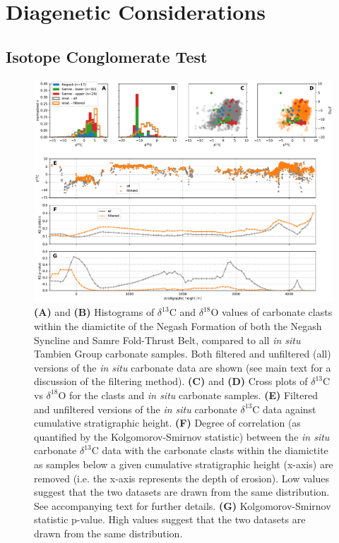 \documentclass[11pt,letterpaper]{article}
\newcommand{\dC}{$\delta^{13}$C\xspace}
\newcommand{\dO}{$\delta^{18}$O\xspace}
\begin{document}
\clearpage

\section*{Diagenetic Considerations}

\subsection*{Isotope Conglomerate Test}

\begin{figure}[h!]
\begin{center}
	\includegraphics[width=\textwidth]{Figures/Clast_Analysis_Pval.pdf}
	\caption{\textbf{(A)} and \textbf{(B)} Histograms of \dC and \dO values of carbonate clasts within the diamictite of the Negash Formation of both the Negash Syncline and Samre Fold-Thrust Belt, compared to all \textit{in situ} Tambien Group carbonate samples. Both filtered and unfiltered (all) versions of the \textit{in situ} carbonate data are shown (see main text for a discussion of the filtering method). \textbf{(C)} and \textbf{(D)} Cross plots of \dC vs \dO for the clasts and \textit{in situ} carbonate samples. \textbf{(E)} Filtered and unfiltered versions of the \textit{in situ} carbonate \dC data against cumulative stratigraphic height. \textbf{(F)} Degree of correlation (as quantified by the Kolgomorov-Smirnov statistic) between the \textit{in situ} carbonate \dC data with the carbonate clasts within the diamictite as samples below a given cumulative stratigraphic height (x-axis) are removed (i.e. the x-axis represents the depth of erosion). Low values suggest that the two datasets are drawn from the same distribution. See accompanying text for further details. \textbf{(G)} Kolgomorov-Smirnov statistic p-value. High values suggest that the two datasets are drawn from the same distribution.}
	\label{fig:Clast_Analysis_Pval}
\end{center}
\end{figure}
\end{document}
